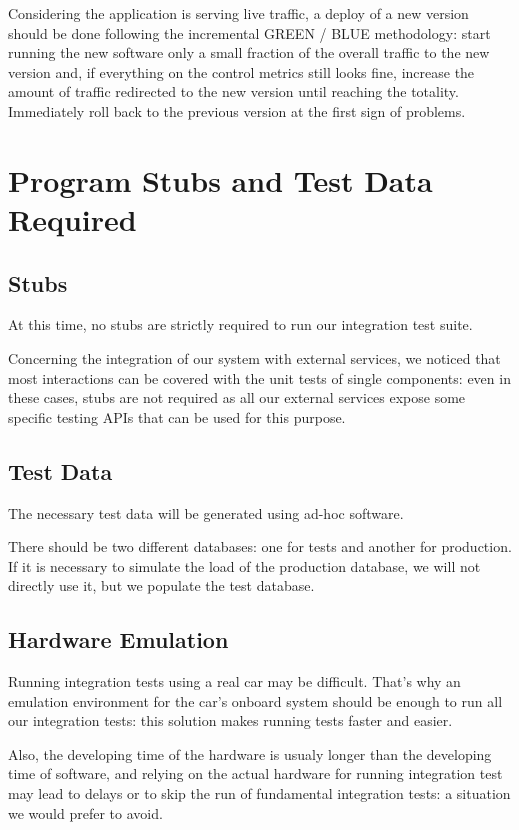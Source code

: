 \documentclass[11pt]{article} %
\begin{document}
Considering the application is serving live traffic, a deploy of a new version should be done following the incremental GREEN / BLUE methodology: start running the new software only a small fraction of the overall traffic to the new version and, if everything on the control metrics still looks fine, increase the amount of traffic redirected to the new version until reaching the totality. Immediately roll back to the previous version at the first sign of problems.

\newpage
\section{Program Stubs and Test Data Required}

\subsection{Stubs}

At this time, no stubs are strictly required to run our integration test suite.

Concerning the integration of our system with external services, we noticed that most interactions can be covered with the unit tests of single components: even in these cases, stubs are not required as all our external services expose some specific testing APIs that can be used for this purpose.

\subsection{Test Data}

The necessary test data will be generated using ad-hoc software.

There should be two different databases: one for tests and another for production. If it is necessary to simulate the load of the production database, we will not directly use it, but we populate the test database.

\subsection{Hardware Emulation}

Running integration tests using a real car may be difficult. That's why an emulation environment for the car's onboard system should be enough to run all our integration tests: this solution makes running tests faster and easier. 

Also, the developing time of the hardware is usualy longer than the developing time of software, and relying on the actual hardware for running integration test may lead to delays or to skip the run of fundamental integration tests: a situation we would prefer to avoid.
\end{document}

